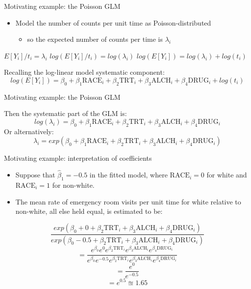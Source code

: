 \documentclass[ignorenonframetext,]{beamer}
\providecommand{\tightlist}{%
  \setlength{\itemsep}{0pt}\setlength{\parskip}{0pt}}
\begin{document}
\begin{frame}{Motivating example: the Poisson GLM}

\begin{itemize}
\tightlist
\item
  Model the number of counts per unit time as Poisson-distributed

  \begin{itemize}
  \tightlist
  \item
    so the expected number of counts per time is \(\lambda_i\)
  \end{itemize}
\end{itemize}

\(E[Y_i]/t_i = \lambda_i\) \newline
\(log(E[Y_i]/t_i) = log(\lambda_i)\) \newline
\(log(E[Y_i]) = log(\lambda_i) + log(t_i)\) \newline

Recalling the log-linear model systematic component:
\[log(E[Y_i]) = \beta_0 + \beta_1 \textrm{RACE}_i + \beta_2 \textrm{TRT}_i + \beta_3 \textrm{ALCH}_i + \beta_4 \textrm{DRUG}_i + log(t_i)\]

\end{frame}

\begin{frame}{Motivating example: the Poisson GLM}

Then the systematic part of the GLM is: \[
log(\lambda_i) = \beta_0 + \beta_1 \textrm{RACE}_i + \beta_2 \textrm{TRT}_i + \beta_3 \textrm{ALCH}_i + \beta_4 \textrm{DRUG}_i
\] Or alternatively: \[
\lambda_i = exp \left( \beta_0 + \beta_1 \textrm{RACE}_i + \beta_2 \textrm{TRT}_i + \beta_3 \textrm{ALCH}_i + \beta_4 \textrm{DRUG}_i \right)
\]

\end{frame}

\begin{frame}{Motivating example: interpretation of coefficients}

\begin{itemize}
\tightlist
\item
  Suppose that \(\hat \beta_1 = -0.5\) in the fitted model, where
  \(\textrm{RACE}_i=0\) for white and \(\textrm{RACE}_i=1\) for
  non-white.
\item
  The mean rate of emergency room visits per unit time for white
  relative to non-white, all else held equal, is estimated to be:
\end{itemize}

\[
\frac{exp \left( \beta_0 + 0 + \beta_2 \textrm{TRT}_i + \beta_3 \textrm{ALCH}_i + \beta_4 \textrm{DRUG}_i \right)}{exp \left( \beta_0 - 0.5 + \beta_2 \textrm{TRT}_i + \beta_3 \textrm{ALCH}_i + \beta_4 \textrm{DRUG}_i \right)}
\] \[
= \frac{e^{\beta_0} e^0 e^{\beta_2 \textrm{TRT}_i} e^{\beta_3 \textrm{ALCH}_i} e^{\beta_4 \textrm{DRUG}_i}}
{e^{\beta_0} e^{-0.5} e^{\beta_2 \textrm{TRT}_i} e^{\beta_3 \textrm{ALCH}_i} e^{\beta_4 \textrm{DRUG}_i}}
\] \[
= \frac{e^0}{e^{-0.5}}
\] \[
= e^{0.5} \approxeq 1.65
\]

\end{frame}
\end{document}
